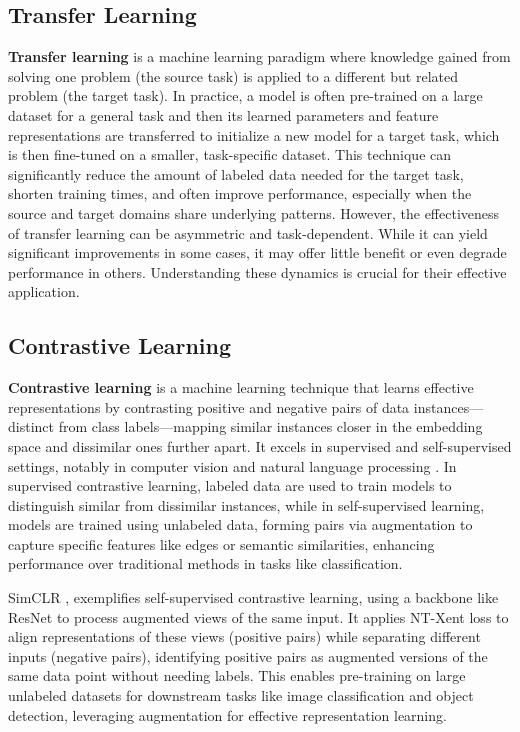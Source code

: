 \subsection{Transfer Learning}

\textbf{Transfer learning} \citep{Bozinovski1976,Tan2018} is a machine learning paradigm where knowledge gained from solving one problem (the source task) is applied to a different but related problem (the target task). In practice, a model is often pre-trained on a large dataset for a general task and then its learned parameters and feature representations are transferred to initialize a new model for a target task, which is then fine-tuned on a smaller, task-specific dataset. This technique can significantly reduce the amount of labeled data needed for the target task, shorten training times, and often improve performance, especially when the source and target domains share underlying patterns. However, the effectiveness of transfer learning can be asymmetric and task-dependent. While it can yield significant improvements in some cases, it may offer little benefit or even degrade performance in others. Understanding these dynamics is crucial for their effective application.

\subsection{Contrastive Learning}

\textbf{Contrastive learning} is a machine learning technique that learns effective representations by contrasting positive and negative pairs of data instances—distinct from class labels—mapping similar instances closer in the embedding space and dissimilar ones further apart. It excels in supervised and self-supervised settings, notably in computer vision \citep{Bromley1993,Jing2022} and natural language processing \citep{Zhu2022}. In supervised contrastive learning, labeled data are used to train models to distinguish similar from dissimilar instances, while in self-supervised learning, models are trained using unlabeled data, forming pairs via augmentation to capture specific features like edges or semantic similarities, enhancing performance over traditional methods in tasks like classification.

SimCLR \citep{Chen2020a}, exemplifies self-supervised contrastive learning, using a backbone like ResNet \citep{He2016} to process augmented views of the same input. It applies NT-Xent loss to align representations of these views (positive pairs) while separating different inputs (negative pairs), identifying positive pairs as augmented versions of the same data point without needing labels. This enables pre-training on large unlabeled datasets for downstream tasks like image classification and object detection, leveraging augmentation for effective representation learning.

